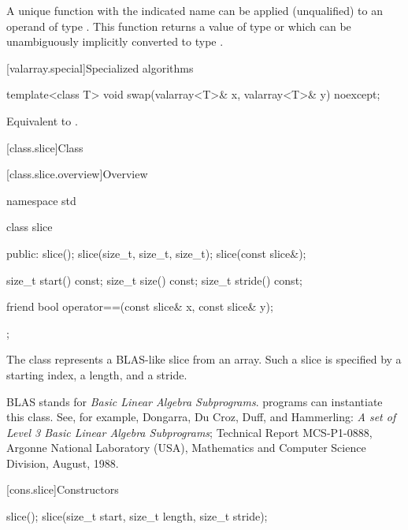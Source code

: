 \begin{itemdescr}
\pnum
\mandates
A unique function with the indicated name can be applied (unqualified)
to an operand of type .
This function returns a value of type 
or which can be unambiguously implicitly converted to type .

\end{itemdescr}

[valarray.special]{Specialized algorithms}

%
\begin{itemdecl}
template<class T> void swap(valarray<T>& x, valarray<T>& y) noexcept;
\end{itemdecl}

\begin{itemdescr}
\pnum
\effects
Equivalent to .
\end{itemdescr}


[class.slice]{Class }

[class.slice.overview]{Overview}

%
\begin{codeblock}
namespace std {
  class slice {
  public:
    slice();
    slice(size_t, size_t, size_t);
    slice(const slice&);

    size_t start() const;
    size_t size() const;
    size_t stride() const;

    friend bool operator==(const slice& x, const slice& y);
  };
}
\end{codeblock}

\pnum
The 
class represents a BLAS-like slice from an array.
Such a slice is specified by a starting index, a length, and a
stride.
\begin{footnote}
BLAS stands for
\textit{Basic Linear Algebra Subprograms}.
\Cpp{} programs can instantiate this class.
See, for example,
Dongarra, Du Croz, Duff, and Hammerling:
\textit{A set of Level 3 Basic Linear Algebra Subprograms};
Technical Report MCS-P1-0888,
Argonne National Laboratory (USA),
Mathematics and Computer Science Division,
August, 1988.
\end{footnote}

[cons.slice]{Constructors}

%
\begin{itemdecl}
slice();
slice(size_t start, size_t length, size_t stride);
\end{itemdecl}

